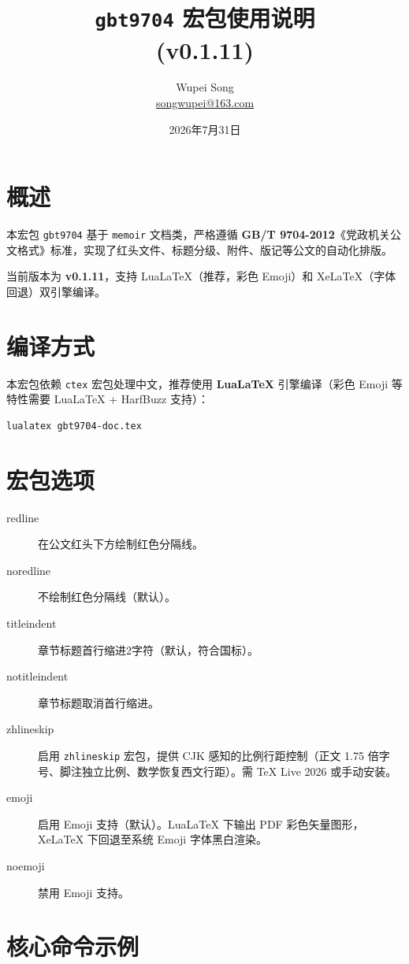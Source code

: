 \documentclass[redline, titleindent, zhlineskip]{gbt9704}
\title{\texttt{gbt9704} 宏包使用说明 \\ (v0.1.11)}
\author{Wupei Song \\ \small{\url{songwupei@163.com}}}
\date{2026年7月31日}
\begin{document}
\maketitle

\tableofcontents

\section{概述}
本宏包 \texttt{gbt9704} 基于 \texttt{memoir} 文档类，严格遵循 \textbf{GB/T 9704-2012}《党政机关公文格式》标准，实现了红头文件、标题分级、附件、版记等公文的自动化排版。

当前版本为 \textbf{v0.1.11}，支持 LuaLaTeX（推荐，彩色 Emoji）和 XeLaTeX（字体回退）双引擎编译。

\section{编译方式}
本宏包依赖 \texttt{ctex} 宏包处理中文，推荐使用 \textbf{LuaLaTeX} 引擎编译（彩色 Emoji 等特性需要 LuaLaTeX + HarfBuzz 支持）：
\begin{verbatim}
lualatex gbt9704-doc.tex
\end{verbatim}

\section{宏包选项}
\begin{description}
  \item[redline] 在公文红头下方绘制红色分隔线。
  \item[noredline] 不绘制红色分隔线（默认）。
  \item[titleindent] 章节标题首行缩进2字符（默认，符合国标）。
  \item[notitleindent] 章节标题取消首行缩进。
  \item[zhlineskip] 启用 \texttt{zhlineskip} 宏包，提供 CJK 感知的比例行距控制（正文 1.75 倍字号、脚注独立比例、数学恢复西文行距）。需 TeX Live 2026 或手动安装。
  \item[emoji] 启用 Emoji 支持（默认）。LuaLaTeX 下输出 PDF 彩色矢量图形，XeLaTeX 下回退至系统 Emoji 字体黑白渲染。
  \item[noemoji] 禁用 Emoji 支持。
\end{description}

\section{核心命令示例}
\end{document}
